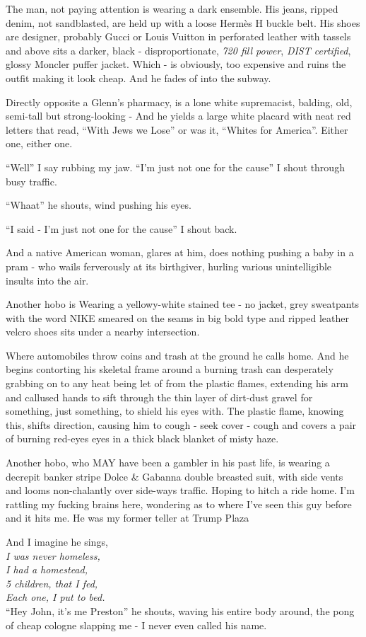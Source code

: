 \documentclass[19pt,openany]{book}
\begin{document}
The man, not paying
attention is wearing a
dark ensemble. His jeans,
ripped denim, not sandblasted,
are held up with a loose
Hermès H buckle belt. His
shoes are designer, probably
Gucci or Louis Vuitton in perforated
leather with tassels and above
sits a darker, black -
disproportionate,
\textit{720 fill power},
\textit{DIST certified}, glossy
Moncler puffer jacket.
Which - is obviously, too
expensive and
ruins the outfit making
it look cheap. And he fades
of into the subway.

Directly opposite
a Glenn's pharmacy, is a
lone white
supremacist, balding, old,
semi-tall but strong-looking -
And he yields
a large white placard with
neat red
letters that read, ``With
Jews we Lose''  or was it,
``Whites for America''.
Either one, either one.

``Well'' I say rubbing my
jaw. ``I'm just not one for
the cause'' I shout through
busy traffic.

``Whaat'' he shouts, wind pushing
his eyes.

``I said - I'm just not one for the cause''
I shout back.

And a native American
woman, glares
at him, does nothing pushing
a baby in a pram -
who wails ferverously at its
birthgiver, hurling
various unintelligible insults
into the air.

Another hobo is
Wearing a
yellowy-white stained tee
- no jacket, grey
sweatpants with the word
NIKE smeared on the seams
in big bold type and
ripped leather velcro shoes
sits under a nearby intersection.

Where automobiles throw
coins and trash at the ground he
calls home. And he begins
contorting his skeletal
frame around a
burning trash can
desperately grabbing on to any heat
being let of from the
plastic flames,
extending his arm
and callused hands to
sift through the thin
layer of dirt-dust gravel
for something, just
something, to shield his
eyes with. The plastic flame,
knowing this, shifts
direction,
causing him to
cough - seek cover - cough and
covers a pair of burning red-eyes
eyes in a thick black blanket of misty haze.

Another hobo, who MAY have
been a gambler in his past life,
is wearing a decrepit banker stripe
Dolce \& Gabanna double breasted
suit, with side vents and looms
non-chalantly over side-ways traffic.
Hoping to hitch a ride home. I'm rattling
my fucking brains here, wondering
as to where I've seen this guy before
and it hits me. He was my former
teller at Trump Plaza

And I imagine he sings,\\
\textit{
	I was never homeless,\\
	I had a homestead,\\
	5 children, that I fed,\\
	Each one, I put to bed.\\
}
``Hey John, it's me Preston'' he shouts, waving
his entire body around, the pong of
cheap cologne slapping me - I never even called his name.
\end{document}
